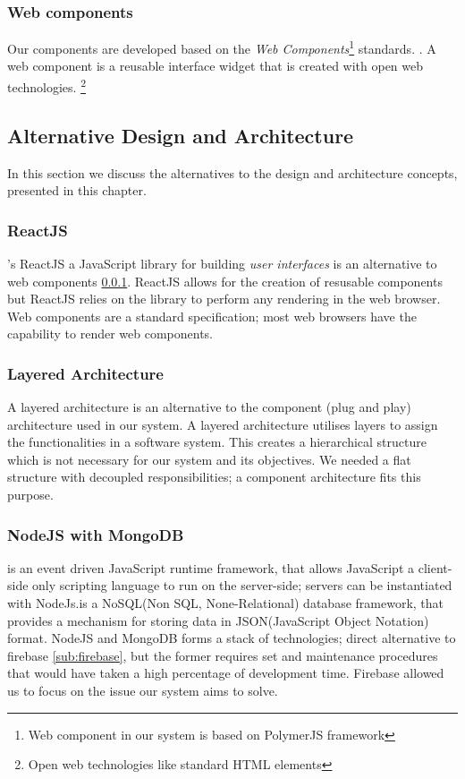 \subsubsection{Web components} \label{sub:webComponents}
Our components are developed based on the \emph{Web Components}\footnote{ Web component in our system is based on PolymerJS framework} standards. \cite{website:Mozilla-Developer}. A web component is a reusable interface widget that is created with open web technologies. \footnote{Open web technologies like standard HTML elements} 

\subsection{Alternative Design and Architecture}
In this section we discuss the alternatives to the design and architecture concepts, presented in this chapter.

\subsubsection{ReactJS}
\cite{website:ReactJS}'s ReactJS a JavaScript library for building \emph{user interfaces} is an alternative to web components \ref{sub:webComponents}. ReactJS allows for the creation of resusable components but ReactJS relies on the library to perform any rendering in the web browser. Web components are a standard specification; most web browsers have the capability to render web components.

\subsubsection{Layered Architecture}
A layered architecture is an alternative to the component (plug and play) architecture used in our system. A layered architecture utilises layers to assign the functionalities in a software system. This creates a hierarchical structure which is not necessary for our system and its objectives. We needed a flat structure with decoupled responsibilities; a component architecture fits this purpose.

\subsubsection{NodeJS with MongoDB}
\cite{website:NodeJS} is an event driven JavaScript runtime framework, that allows JavaScript a client-side only scripting language to run on the server-side; servers can be instantiated with NodeJs.\cite{website:MongoDB}is a NoSQL(Non SQL, None-Relational) database framework, that provides a mechanism for storing data in JSON(JavaScript Object Notation) format. NodeJS and MongoDB forms a stack of technologies; direct alternative to firebase \ref{sub:firebase}, but the former requires set and maintenance procedures that would have taken a high percentage of development time. Firebase allowed us to focus on the issue our system aims to solve.